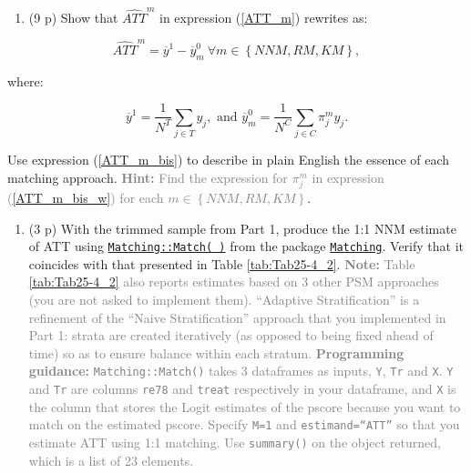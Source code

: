 \documentclass[
]{article}
\providecommand{\tightlist}{%
  \setlength{\itemsep}{0pt}\setlength{\parskip}{0pt}}
\begin{document}
\begin{enumerate}
\def\labelenumi{\arabic{enumi}.}
\setcounter{enumi}{4}
\tightlist
\item
  (9 p) Show that \(\widehat{ATT}^{m}\) in expression (\ref{ATT_m})
  rewrites as:
\end{enumerate}

\begin{equation} \label{ATT_m_bis}
\widehat{ATT}^{m} =\overline{y}^{1}-\overline{y}_{m}^{0} \ \forall m\in \left\{ NNM,RM,KM\right\},
\end{equation}

\noindent where:

\begin{equation}\label{ATT_m_bis_w}
\overline{y}^{1} =\frac{1}{N^{T}}\sum_{j \in T}y_{j}, \text{     and      }  \overline{y}_{m}^{0} =\frac{1}{N^{C}}\sum_{j \in C}\pi_{j}^{m}y_{j}.
\end{equation}

\noindent Use expression (\ref{ATT_m_bis}) to describe in plain English
the essence of each matching approach.
\textcolor{gray}{\textbf{Hint:} Find the expression for $\pi _{j}^{m}$ in expression (\ref{ATT_m_bis_w}) for each $m\in \left\{NNM,RM,KM\right\} $}.

\begin{enumerate}
\def\labelenumi{\arabic{enumi}.}
\setcounter{enumi}{5}
\tightlist
\item
  (3 p) With the trimmed sample from Part 1, produce the 1:1 NNM
  estimate of ATT using
  \href{https://www.rdocumentation.org/packages/Matching/versions/4.9-6/topics/Match}{\texttt{Matching::Match( )}}
  from the package
  \href{https://cran.r-project.org/web/packages/Matching/Matching.pdf}{\texttt{Matching}}.
  Verify that it coincides with that presented in Table
  \ref{tab:Tab25-4_2}.
  \textcolor{gray}{\textbf{Note:} Table \ref{tab:Tab25-4_2} also reports estimates based on 3 other PSM approaches (you are not asked to implement them). ``Adaptive Stratification'' is a refinement of the ``Naive Stratification'' approach that you implemented in Part 1: strata are created iteratively (as opposed to being fixed ahead of time) so as to ensure balance within each stratum.}
  \textcolor{gray}{\textbf{Programming guidance:} \texttt{Matching::Match()} takes 3 dataframes as inputs, \texttt{Y}, \texttt{Tr} and \texttt{X}. \texttt{Y} and \texttt{Tr} are columns \texttt{re78} and \texttt{treat} respectively in your dataframe, and \texttt{X} is the column that stores the Logit estimates of the pscore because you want to match on the estimated pscore. Specify \texttt{M=1} and \texttt{estimand=``ATT''} so that you estimate ATT using 1:1 matching. Use \texttt{summary()} on the object returned, which is a list of 23 elements.}
  \label{item:estimate-att-ncs}
\end{enumerate}
\end{document}
